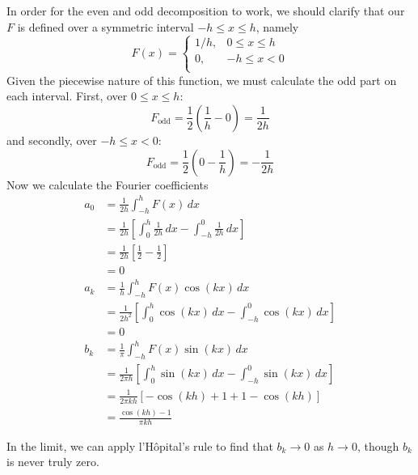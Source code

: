 \documentclass[a4paper]{article}
\begin{document}
In order for the even and odd decomposition to work, we should clarify that our \( F \) is defined over a symmetric interval \( -h \le x \le h \), namely
\[
	F \!\left( x \right) = 
	\begin{cases}
		1 / h, & 0 \le x \le h \\
		0, & -h \le x < 0 \\
	\end{cases}
\]
Given the piecewise nature of this function, we must calculate the odd part on each interval. First, over \( 0 \le x \le h \):
\[
	F_{\text{odd}} = \frac{1}{2}\!\left( \frac{1}{h} - 0 \right) = \frac{1}{2h}
\]
and secondly, over \( -h \le x < 0 \):
\[
	F_{\text{odd}} = \frac{1}{2}\!\left( 0 - \frac{1}{h} \right) = -\frac{1}{2h} 
\]
Now we calculate the Fourier coefficients
\begin{align*}
	a_{0} & = \frac{1}{2 h} \int^{h}_{-h} F \!\left( x \right) \, dx \\
	 & = \frac{1}{2 h} \!\left[ \int^{h}_{0} \frac{1}{2h} \, dx - \int^{0}_{-h} \frac{1}{2h} \, dx \right] \\ 
	 & = \frac{1}{2 h} \!\left[ \frac{1}{2} - \frac{1}{2} \right] \\
	 & = 0 \\
	a_{k} & = \frac{1}{h} \int^{h}_{-h} F \!\left( x \right) \cos\!\left(kx\right) \, dx  \\
	 & = \frac{1}{2h^{2}} \!\left[ \int^{h}_{0} \cos\!\left(kx\right) \, dx - \int^{0}_{-h} \cos\!\left(kx\right) \, dx \right] \\
	 & = 0 \\
	b_{k} & = \frac{1}{\pi} \int^{h}_{-h} F \!\left( x \right)\sin\!\left(kx\right) \, dx \\
	 & = \frac{1}{2 \pi h} \!\left[ \int^{h}_{0} \sin\!\left(kx\right) \, dx - \int^{0}_{-h} \sin\!\left(kx\right) \, dx \right] \\
	 & = \frac{1}{2 \pi kh} \!\left[ -\cos\!\left(kh\right) + 1 + 1 - \cos\!\left(kh\right) \right] \\
	 & = \frac{\cos\!\left(kh\right) - 1}{\pi k h}
\end{align*}

In the limit, we can apply l'H\^{o}pital's rule to find that \( b_{k} \rightarrow 0 \) as \( h \rightarrow 0 \), though \( b_{k} \) is never truly zero.

\vspace{12pt}

\end{document}

